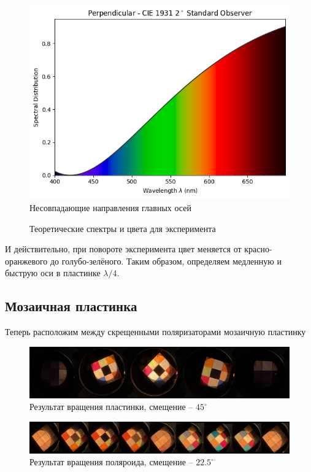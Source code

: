 \documentclass[12pt, a4paper]{article}
\begin{document}
\begin{figure}[H]
\begin{minipage}[t]{0.48\textwidth}
        \includegraphics[width=\linewidth]{pics/parallel_spectrum.png}
        Несовпадающие направления главных осей
    \end{minipage}
    \caption{Теоретические спектры и цвета для эксперимента}
    \label{fig:combined}
\end{figure}

И действительно, при повороте эксперимента цвет меняется от красно-оранжевого
до голубо-зелёного. Таким образом, определяем медленную и быструю оси в
пластинке $\lambda/4$.

\subsection{Мозаичная пластинка}
Теперь расположим между скрещенными поляризаторами мозаичную пластинку
\begin{figure}[H]
    \centering %
    \includegraphics[width=0.6\linewidth]{pics/plate.png}
    \caption{Результат вращения пластинки, смещение -- $45^\circ$}
    \label{pic:plate}
\end{figure}
\begin{figure}[H]
    \centering %
    \includegraphics[width=0.95\linewidth]{pics/polaroid.png}
    \caption{Результат вращения поляроида, смещение -- $22.5^\circ$}
    \label{pic:polaroid}
\end{figure}
\end{document}
